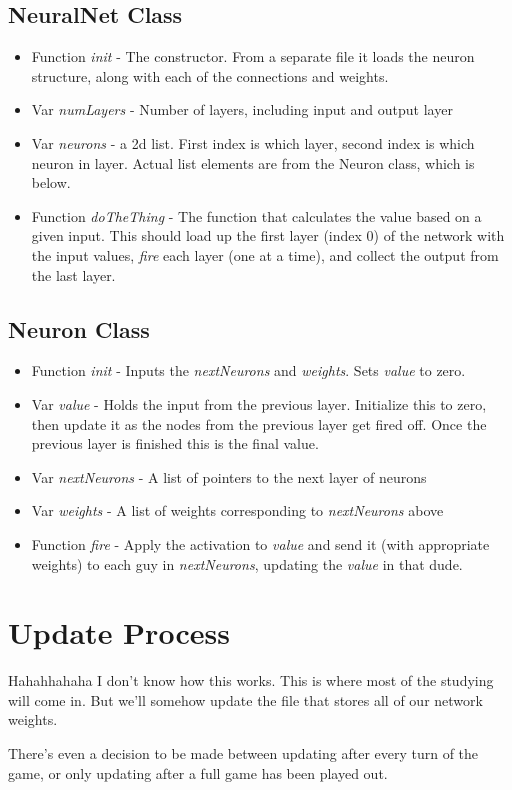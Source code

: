 \documentclass{article}[12pt]
\begin{document}
\subsection{NeuralNet Class}

\begin{itemize}
\item Function \emph{init} - The constructor. From a separate file it loads the neuron structure, along with each of the connections and weights.
\item Var \emph{numLayers} - Number of layers, including input and output layer
\item Var \emph{neurons} - a 2d list. First index is which layer, second index is which neuron in layer. Actual list elements are from the Neuron class, which is below.
\item Function \emph{doTheThing} - The function that calculates the value based on a given input. This should load up the first layer (index 0) of the network with the input values, \emph{fire} each layer (one at a time), and collect the output from the last layer.
\end{itemize}

\subsection{Neuron Class}

\begin{itemize}
\item Function \emph{init} - Inputs the \emph{nextNeurons} and \emph{weights}. Sets \emph{value} to zero.
\item Var \emph{value} - Holds the input from the previous layer. Initialize this to zero, then update it as the nodes from the previous layer get fired off. Once the previous layer is finished this is the final value.
\item Var \emph{nextNeurons} - A list of pointers to the next layer of neurons
\item Var \emph{weights} - A list of weights corresponding to \emph{nextNeurons} above
\item Function \emph{fire} - Apply the activation to \emph{value} and send it (with appropriate weights) to each guy in \emph{nextNeurons}, updating the \emph{value} in that dude.
\end{itemize}

\section{Update Process}

Hahahhahaha I don't know how this works. This is where most of the studying will come in. But we'll somehow update the file that stores all of our network weights.

There's even a decision to be made between updating after every turn of the game, or only updating after a full game has been played out.
\end{document}
